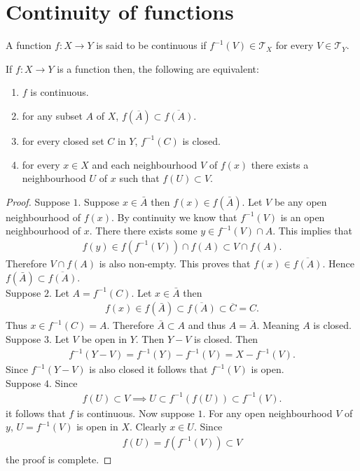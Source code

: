 \section{Continuity of functions}
\begin{definition}
  A function $f:X\to Y$ is said to be continuous if $f^{-1}(V) \in \mathscr{T}_X$ for every $V\in \mathscr{T}_Y$.
\end{definition}
\begin{theorem}
  If $f:X\to Y$ is a function then, the following are equivalent:
  \begin{enumerate}
    \item $f$ is continuous.
    \item for any subset $A$ of $X$, $f(\overline{A}) \subset \overline{f(A)}$.
    \item for every closed set $C$ in $Y$, $f^{-1}(C)$ is closed.
    \item for every $x\in X$ and each neighbourhood $V$ of $f(x)$ there exists a neighbourhood $U$ of $x$ such that $f(U) \subset V$.
  \end{enumerate}
\end{theorem}
\begin{proof}
  Suppose $1$. Suppose $x\in \bar{A}$ then $f(x)\in f(\bar{A})$. Let $V$ be any open neighbourhood of $f(x)$. By continuity we know that $f^{-1}(V)$ is an open neighbourhood of $x$. There there exists some $y\in f^{-1}(V)\cap A$. This implies that
  \begin{align*}
    f(y) \in f(f^{-1}(V))\cap f(A) \subset V\cap f(A).
  \end{align*}
  Therefore $V\cap f(A)$ is also non-empty. This proves that $f(x)\in \overline{f(A)}$. Hence $f(\bar{A}) \subset \overline{f(A)}$.\\

  Suppose $2$. Let $A = f^{-1}(C)$. Let $x\in \bar{A}$ then 
  \begin{align*}
    f(x) \in f(\bar{A}) \subset \overline{f(A)} \subset \overline{C} = C. 
  \end{align*}
  Thus $x\in f^{-1}(C) = A$. Therefore $\bar{A} \subset A$ and thus $A = \bar{A}$. Meaning $A$ is closed.\\

  Suppose $3$. Let $V$ be open in $Y$. Then $Y-V$ is closed. Then
  \begin{align*}
    f^{-1}(Y-V) = f^{-1}(Y) - f^{-1}(V) = X - f^{-1}(V).
  \end{align*}
  Since $f^{-1}(Y-V)$ is also closed it follows that $f^{-1}(V)$ is open.\\

  Suppose $4$. Since
  \begin{align*}
    f(U) \subset V \implies U \subset f^{-1}(f(U)) \subset f^{-1}(V).
  \end{align*}
  it follows that $f$ is continuous. Now suppose $1$. For any open neighbourhood $V$ of $y$, $U = f^{-1}(V)$ is open in $X$. Clearly $x\in U$. Since
  \begin{align*}
    f(U) = f(f^{-1}(V)) \subset V
  \end{align*}
  the proof is complete.
\end{proof}
